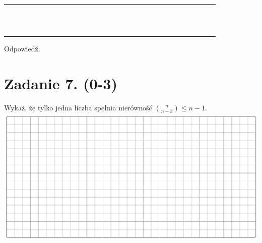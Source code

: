 \documentclass[10pt]{article}
\begin{document}
\begin{center}
\begin{tabular}{|c|c|c|c|c|c|c|c|c|c|c|c|c|c|c|c|c|c|c|c|c|c|c|c|c|c|c|c|c|c|}
\hline
 &  &  &  &  &  &  &  &  &  &  &  &  &  &  &  &  &  &  &  &  &  &  &  &  &  &  &  &  &  \\
\hline
 &  &  &  &  &  &  &  &  &  &  &  &  &  &  &  &  &  &  &  &  &  &  &  &  &  &  &  &  &  \\
\hline
 &  &  &  &  &  &  &  &  &  &  &  &  &  &  &  &  &  &  &  &  &  &  &  &  &  &  &  &  &  \\
\hline
 &  &  &  &  &  &  &  &  &  &  &  &  &  &  &  &  &  &  &  &  &  &  &  &  &  &  &  &  &  \\
\hline
 &  &  &  &  &  &  &  &  &  &  &  &  &  &  &  &  &  &  &  &  &  &  &  &  &  &  &  &  &  \\
\hline
 &  &  &  &  &  &  &  &  &  &  &  &  &  &  &  &  &  &  &  &  &  &  &  &  &  &  &  &  &  \\
\hline
 &  &  &  &  &  &  &  &  &  &  &  &  &  &  &  &  &  &  &  &  &  &  &  &  &  &  &  &  &  \\
\hline
 &  &  &  &  &  &  &  &  &  &  &  &  &  &  &  &  &  &  &  &  &  &  &  &  &  &  &  &  &  \\
\hline
 &  &  &  &  &  &  &  &  &  &  &  &  &  &  &  &  &  &  &  &  &  &  &  &  &  &  &  &  &  \\
\hline
 &  &  &  &  &  &  &  &  &  &  &  &  &  &  &  &  &  &  &  &  &  &  &  &  &  &  &  &  &  \\
\hline
 &  &  &  &  &  &  &  &  &  &  &  &  &  &  &  &  &  &  &  &  &  &  &  &  &  &  &  &  &  \\
\hline
 &  &  &  &  &  &  &  &  &  &  &  &  &  &  &  &  &  &  &  &  &  &  &  &  &  &  &  &  &  \\
\hline
 &  &  &  &  &  &  &  &  &  &  &  &  &  &  &  &  &  &  &  &  &  &  &  &  &  &  &  &  &  \\
\hline
\end{tabular}
\end{center}

Odpowiedź: \(\qquad\)

\section*{Zadanie 7. (0-3)}
Wykaż, że tylko jedna liczba spełnia nierówność \(\binom{n}{n-3} \leq n-1\).\\
\includegraphics[max width=\textwidth, center]{2024_11_21_599d917d55a506aace4bg-05}
\end{document}
